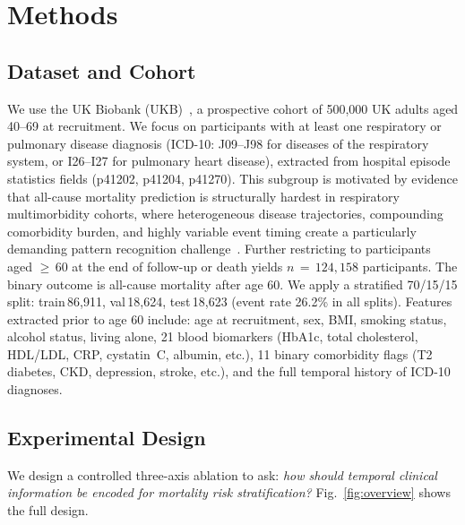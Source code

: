 \section{Methods}

\subsection{Dataset and Cohort}
We use the UK Biobank (UKB)~\cite{ukbiobank}, a prospective cohort of
500{,}000 UK adults aged 40--69 at recruitment.
We focus on participants with at least one respiratory or pulmonary disease
diagnosis (ICD-10: J09--J98 for diseases of the respiratory system, or
I26--I27 for pulmonary heart disease), extracted from hospital episode
statistics fields (p41202, p41204, p41270).
This subgroup is motivated by evidence that all-cause mortality prediction
is structurally hardest in respiratory multimorbidity cohorts, where
heterogeneous disease trajectories, compounding comorbidity burden, and
highly variable event timing create a particularly demanding pattern
recognition challenge~\cite{ukbmdrmf}.
Further restricting to participants aged $\geq$\,60 at the end of follow-up
or death yields $n\,=\,124{,}158$ participants.
The binary outcome is all-cause mortality after age 60.
We apply a stratified 70/15/15 split: train\,86{,}911,
val\,18{,}624, test\,18{,}623 (event rate 26.2\% in all splits).
Features extracted prior to age 60 include: age at recruitment, sex, BMI,
smoking status, alcohol status, living alone, 21 blood biomarkers
(HbA1c, total cholesterol, HDL/LDL, CRP, cystatin~C, albumin, etc.),
11 binary comorbidity flags (T2 diabetes, CKD, depression, stroke, etc.),
and the full temporal history of ICD-10 diagnoses.

\subsection{Experimental Design}
\label{sec:design}
We design a controlled three-axis ablation to ask:
\emph{how should temporal clinical information be encoded for mortality
risk stratification?}
Fig.~\ref{fig:overview} shows the full design.

